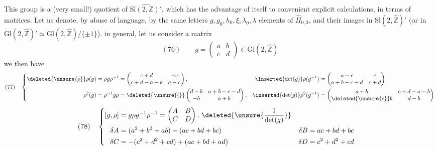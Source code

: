 This group is a (very small!) quotient of $\widehat{\mathrm{Sl}(2,\mathbb Z)'}$, which has the advantage of  itself to convenient explicit  calculations, in terms of matrices. Let us denote, by abuse of language, by the same letters $g,g_0,h_0,\xi,\lambda_0,\lambda$ elements of  $\widehat{\Pi}_{0,3}$,  and their images in  $\mathrm{Sl}(2,\widehat{\mathbb Z})'$  (or in $\mathrm{Gl}(2,\widehat{\mathbb Z})'\simeq\mathrm{Gl}(2,\widehat{\mathbb Z})/\{\pm1\}$).   in general, let us consider a matrix
\[
(76)\qquad g=\begin{pmatrix}a&b\\c&d\end{pmatrix}\in\mathrm{Gl}(2,\widehat{\mathbb Z})
\]
we then have
\[
(77)\quad
\left\{\begin{aligned}
\deleted{\unsure{\rho}}\rho(g)&=\rho g\rho^{-1}=\begin{pmatrix}c+d&-c\\c+d-a-b&a-c\end{pmatrix},
&\inserted{\det(g)}\rho(g^{-1})&=\begin{pmatrix}a-c&c\\a+b-c-d&c+d\end{pmatrix}\\
\rho^2(g)&=\rho^{-1}g\rho=\deleted{\unsure{(}}\begin{pmatrix}d-b&a+b-c-d\\-b&a+b\end{pmatrix},
&\inserted{\det(g)}\rho^2(g^{-1})&=\begin{pmatrix}a+b&c+d-a-b\\\deleted{\unsure{c}}b&d-b\end{pmatrix}
\end{aligned}\right.
\]
\[
(78)\quad
\left\{\begin{aligned}
\relax[g,\rho]&=g\rho g^{-1}\rho^{-1}=\begin{pmatrix}A&B\\C&D\end{pmatrix}.\ \deleted{\unsure{\frac{1}{\det(g)}}}\\
\delta A&=(a^2+b^2+ab)-(ac+bd+bc)&\delta B&=ac+bd+bc\\
\delta C&=-(c^2+d^2+cd)+(ac+bd+ad)&\delta D&=c^2+d^2+cd
\end{aligned}\right.
\]

